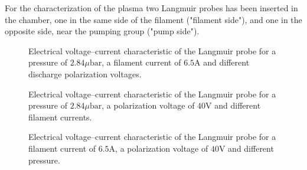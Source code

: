 \documentclass[11pt,a4 paper]{article}
\begin{document}
For the characterization of the plasma two Langmuir probes has been inserted in the chamber, one in the same side of the filament ("filament side"), and one in the opposite side, near the pumping group ("pump side").
%
\begin{figure}[H]
\vspace{-0.3cm}%
 \vspace{-0.3cm}\caption{Electrical voltage--current characteristic of the Langmuir probe for a pressure of $2.84\si{\mu\bar}$, a filament current of $6.5\si{\ampere}$ and different discharge polarization voltages.}\label{fig:Lang}%
\end{figure}%
\vspace{-0.8cm}%
\begin{figure}[H]
  \vspace{-0.3cm}\caption{Electrical voltage--current characteristic of the Langmuir probe for a pressure of $2.84\si{\mu\bar}$, a polarization voltage of $40\si{\volt}$ and different filament currents.}\label{fig:Lang_c}%
\end{figure}%
\vspace{-0.8cm}%
\begin{figure}[H]
  \vspace{-0.3cm}\caption{Electrical voltage--current characteristic of the Langmuir probe for a filament current of $6.5\si{\ampere}$, a polarization voltage of $40\si{\volt}$ and different pressure.}\label{fig:Lang_p}%
\end{figure}
\end{document}
